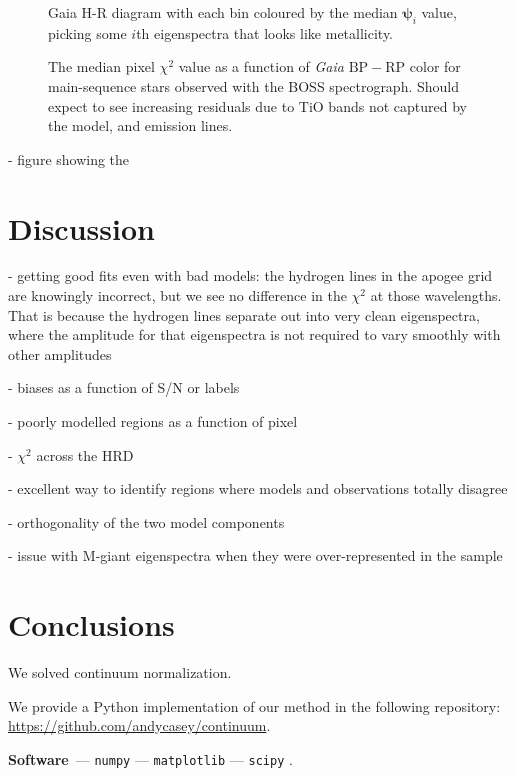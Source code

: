 \documentclass[modern]{aastex631}
\renewcommand{\paragraph}[1]{\medskip\par\noindent\textbf{#1}~---}
\newcommand{\vecpsi}{\boldsymbol{\psi}}
\newcommand{\todo}[1]{\textcolor{tab:blue}{#1}}
\begin{document}
\begin{figure}
    \caption{Gaia H-R diagram with each bin coloured by the median $\vecpsi_i$ value, picking some $i$th eigenspectra that looks like metallicity. \label{fig:gaia_hrd_metallicity}}
\end{figure}


\begin{figure*}
    \caption{The median pixel $\chi^2$ value as a function of \emph{Gaia} $\mathrm{BP} - \mathrm{RP}$ color for main-sequence stars observed with the BOSS spectrograph. \todo{Should expect to see increasing residuals due to TiO bands not captured by the model, and emission lines.}}
\end{figure*}


- figure showing the 

\section{Discussion}\label{sec:discussion}

- getting good fits even with bad models: the hydrogen lines in the apogee grid are knowingly incorrect, but we see no difference in the $\chi^2$ at those wavelengths. That is because the hydrogen lines separate out into very clean eigenspectra, where the amplitude for that eigenspectra is not required to vary smoothly with other amplitudes

- biases as a function of S/N or labels

- poorly modelled regions as a function of pixel

- $\chi^2$ across the HRD

- excellent way to identify regions where models and observations totally disagree

- orthogonality of the two model components

- issue with M-giant eigenspectra when they were over-represented in the sample


\section{Conclusions}
\label{sec:conclusions}

We solved continuum normalization.


\noindent{}We provide a Python implementation of our method in the following repository: \url{https://github.com/andycasey/continuum}. 

\paragraph{Software}
\texttt{numpy} \citep{numpy} ---
\texttt{matplotlib} \citep{matplotlib} ---
\texttt{scipy} \citep{scipy}.
\end{document}
